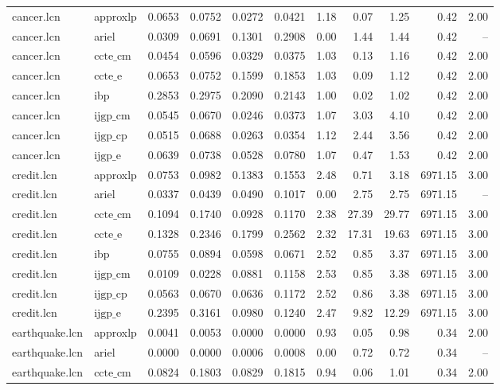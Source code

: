 \begin{table}[ht]
\begin{tabular}{llrrrrrrrrr}
cancer.lcn & approxlp & 0.0653 & 0.0752 & 0.0272 & 0.0421 & 1.18 & 0.07 & 1.25 & 0.42 & 2.00 \\
cancer.lcn & ariel & 0.0309 & 0.0691 & 0.1301 & 0.2908 & 0.00 & 1.44 & 1.44 & 0.42 & -- \\
cancer.lcn & $\text{ccte\_cm}$ & 0.0454 & 0.0596 & 0.0329 & 0.0375 & 1.03 & 0.13 & 1.16 & 0.42 & 2.00 \\
cancer.lcn & $\text{ccte\_e}$ & 0.0653 & 0.0752 & 0.1599 & 0.1853 & 1.03 & 0.09 & 1.12 & 0.42 & 2.00 \\
cancer.lcn & ibp & 0.2853 & 0.2975 & 0.2090 & 0.2143 & 1.00 & 0.02 & 1.02 & 0.42 & 2.00 \\
cancer.lcn & $\text{ijgp\_cm}$ & 0.0545 & 0.0670 & 0.0246 & 0.0373 & 1.07 & 3.03 & 4.10 & 0.42 & 2.00 \\
cancer.lcn & $\text{ijgp\_cp}$ & 0.0515 & 0.0688 & 0.0263 & 0.0354 & 1.12 & 2.44 & 3.56 & 0.42 & 2.00 \\
cancer.lcn & $\text{ijgp\_e}$ & 0.0639 & 0.0738 & 0.0528 & 0.0780 & 1.07 & 0.47 & 1.53 & 0.42 & 2.00 \\
credit.lcn & approxlp & 0.0753 & 0.0982 & 0.1383 & 0.1553 & 2.48 & 0.71 & 3.18 & 6971.15 & 3.00 \\
credit.lcn & ariel & 0.0337 & 0.0439 & 0.0490 & 0.1017 & 0.00 & 2.75 & 2.75 & 6971.15 & -- \\
credit.lcn & $\text{ccte\_cm}$ & 0.1094 & 0.1740 & 0.0928 & 0.1170 & 2.38 & 27.39 & 29.77 & 6971.15 & 3.00 \\
credit.lcn & $\text{ccte\_e}$ & 0.1328 & 0.2346 & 0.1799 & 0.2562 & 2.32 & 17.31 & 19.63 & 6971.15 & 3.00 \\
credit.lcn & ibp & 0.0755 & 0.0894 & 0.0598 & 0.0671 & 2.52 & 0.85 & 3.37 & 6971.15 & 3.00 \\
credit.lcn & $\text{ijgp\_cm}$ & 0.0109 & 0.0228 & 0.0881 & 0.1158 & 2.53 & 0.85 & 3.38 & 6971.15 & 3.00 \\
credit.lcn & $\text{ijgp\_cp}$ & 0.0563 & 0.0670 & 0.0636 & 0.1172 & 2.52 & 0.86 & 3.38 & 6971.15 & 3.00 \\
credit.lcn & $\text{ijgp\_e}$ & 0.2395 & 0.3161 & 0.0980 & 0.1240 & 2.47 & 9.82 & 12.29 & 6971.15 & 3.00 \\
earthquake.lcn & approxlp & 0.0041 & 0.0053 & 0.0000 & 0.0000 & 0.93 & 0.05 & 0.98 & 0.34 & 2.00 \\
earthquake.lcn & ariel & 0.0000 & 0.0000 & 0.0006 & 0.0008 & 0.00 & 0.72 & 0.72 & 0.34 & -- \\
earthquake.lcn & $\text{ccte\_cm}$ & 0.0824 & 0.1803 & 0.0829 & 0.1815 & 0.94 & 0.06 & 1.01 & 0.34 & 2.00 \\

\end{tabular}
\end{table}
